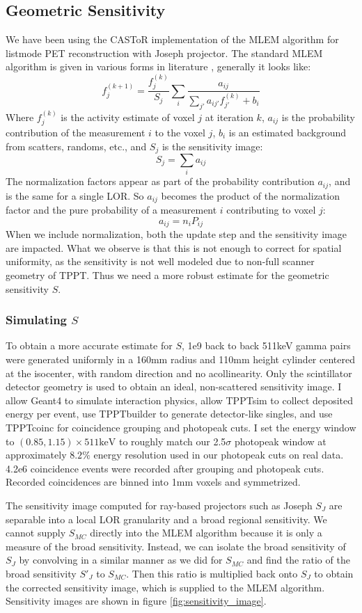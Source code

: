 \documentclass{article}
\begin{document}
\newpage
\subsection{Geometric Sensitivity}
We have been using the CASToR \cite{castor} implementation of the MLEM algorithm for listmode PET reconstruction with Joseph projector. The standard MLEM algorithm is given in various forms in literature \cite{mlemalgorithm} \cite{tof_mlem_jpet},  generally it looks like:
\[f_j^{(k+1)} = \frac{f_j^{(k)}}{S_j} \sum_i\frac{a_{ij}}{\sum_{j'}a_{ij'}f_{j'}^{(k)}+b_i}\]
Where $f_j^{(k)}$ is the activity estimate of voxel $j$ at iteration $k$, $a_{ij}$ is the probability contribution of the measurement $i$ to the voxel $j$, $b_i$ is an estimated background from scatters, randoms, etc., and $S_j$ is the sensitivity image:
\[S_j = \sum_i a_{ij}\]
The normalization factors appear as part of the probability contribution $a_{ij}$, and is the same for a single LOR. So $a_{ij}$ becomes the product of the normalization factor and the pure probability of a measurement $i$ contributing to voxel $j$:
\[a_{ij} = n_i P_{ij}\]
When we include normalization, both the update step and the sensitivity image are impacted. What we observe is that this is not enough to correct for spatial uniformity, as the sensitivity is not well modeled due to non-full scanner geometry of TPPT. Thus we need a more robust estimate for the geometric sensitivity $S$.
\subsubsection{Simulating $S$}
To obtain a more accurate estimate for $S$, 1e9 back to back 511keV gamma pairs were generated uniformly in a 160mm radius and 110mm height cylinder centered at the isocenter, with random direction and no acollinearity. Only the scintillator detector geometry is used to obtain an ideal, non-scattered sensitivity image. I allow Geant4 to simulate interaction physics, allow TPPTsim to collect deposited energy per event, use TPPTbuilder to generate detector-like singles, and use TPPTcoinc for coincidence grouping and photopeak cuts. I set the energy window to $(0.85, 1.15)\times511\text{keV}$ to roughly match our 2.5$\sigma$ photopeak window at approximately $8.2\%$ energy resolution used in our photopeak cuts on real data. 4.2e6 coincidence events were recorded after grouping and photopeak cuts. Recorded coincidences are binned into 1mm voxels and symmetrized.

The sensitivity image computed for ray-based projectors such as Joseph $S_{J}$ are separable into a local LOR granularity and a broad regional sensitivity. We cannot supply $S_{MC}$ directly into the MLEM algorithm because it is only a measure of the broad sensitivity. Instead, we can isolate the broad sensitivity of $S_{J}$ by convolving in a similar manner as we did for $S_{MC}$ and find the ratio of the broad sensitivity $S'_{J}$ to $S_{MC}$. Then this ratio is multiplied back onto $S_{J}$ to obtain the corrected sensitivity image, which is supplied to the MLEM algorithm. Sensitivity images are shown in figure \ref{fig:sensitivity_image}.
\end{document}
